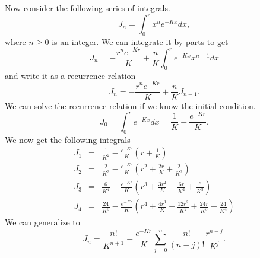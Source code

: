 \documentclass{article}
\numberwithin{equation}{section}
\begin{document}
Now consider the following series of integrals.
\begin{equation}\label{a1e4}
J_n = \int_0^r x^n e^{-Kx}dx,
\end{equation}
where $n \ge 0$ is an integer.  We can integrate it by parts to get 
\[
J_n = -\frac{r^n e^{-Kr}}{K} + \frac{n}{K}\int_0^r e^{-Kx}x^{n-1}dx
\]
and write it as a recurrence relation
\begin{equation}\label{a1e5}
J_n = -\frac{r^n e^{-Kr}}{K} + \frac{n}{K}J_{n-1}.
\end{equation}
We can solve the recurrence relation if we know the initial condition.
\begin{equation}\label{a1e6}
J_0 = \int_0^r e^{-Kx}dx = \frac{1}{K} - \frac{e^{-Kr}}{K}.
\end{equation}
We now get the following integrals
\begin{eqnarray}
J_1 &=& \frac{1}{K^2} - \frac{e^{-Kr}}{K}\left(r + \frac{1}{K}\right)
        \label{a1e7} \\
J_2 &=& \frac{2}{K^3} - \frac{e^{-Kr}}{K}\left(r^2 + \frac{2r}{K} +
	\frac{2}{K^2}\right) \label{a1e8} \\
J_3 &=& \frac{6}{K^4} - \frac{e^{-Kr}}{K}\left(r^3 + \frac{3r^2}{K} +
	\frac{6r}{K^2} + \frac{6}{K^3}\right) \label{a1e9} \\
J_4 &=& \frac{24}{K^5} - \frac{e^{-Kr}}{K}\left(r^4 + \frac{4r^3}{K} + 
	\frac{12r^2}{K^2} + \frac{24r}{K^3} + \frac{24}{K^4}\right)
        \label{a1e10}
\end{eqnarray}
We can generalize to
\begin{equation}\label{a1e11}
J_n = \frac{n!}{K^{n+1}} - \frac{e^{-Kr}}{K}\sum_{j=0}^n\frac{n!}{(n-j)!}
\frac{r^{n-j}}{K^j}.
\end{equation}
\end{document}
